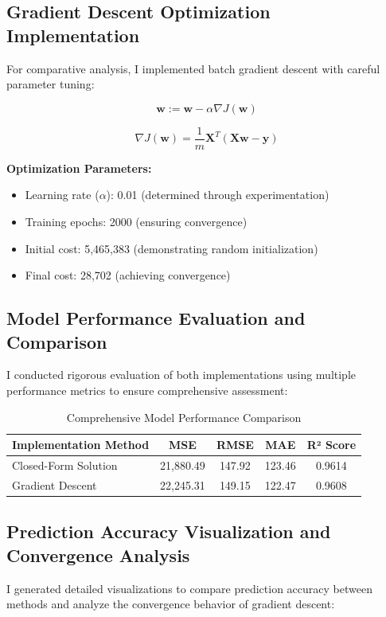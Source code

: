 \documentclass[12pt,a4paper]{article}
\begin{document}
\subsection{Gradient Descent Optimization Implementation}
For comparative analysis, I implemented batch gradient descent with careful parameter tuning:

\begin{equation}
\mathbf{w} := \mathbf{w} - \alpha \nabla J(\mathbf{w})
\end{equation}

\begin{equation}
\nabla J(\mathbf{w}) = \frac{1}{m}\mathbf{X}^T(\mathbf{X}\mathbf{w} - \mathbf{y})
\end{equation}

\textbf{Optimization Parameters:}
\begin{itemize}
\item Learning rate ($\alpha$): 0.01 (determined through experimentation)
\item Training epochs: 2000 (ensuring convergence)
\item Initial cost: 5,465,383 (demonstrating random initialization)
\item Final cost: 28,702 (achieving convergence)
\end{itemize}

\subsection{Model Performance Evaluation and Comparison}
I conducted rigorous evaluation of both implementations using multiple performance metrics to ensure comprehensive assessment:

\begin{table}[H]
\centering
\caption{Comprehensive Model Performance Comparison}
\begin{tabular}{lcccc}
\toprule
\textbf{Implementation Method} & \textbf{MSE} & \textbf{RMSE} & \textbf{MAE} & \textbf{R² Score} \\
\midrule
Closed-Form Solution & 21,880.49 & 147.92 & 123.46 & 0.9614 \\
Gradient Descent & 22,245.31 & 149.15 & 122.47 & 0.9608 \\
\bottomrule
\end{tabular}
\end{table}

\subsection{Prediction Accuracy Visualization and Convergence Analysis}
I generated detailed visualizations to compare prediction accuracy between methods and analyze the convergence behavior of gradient descent:
\end{document}
